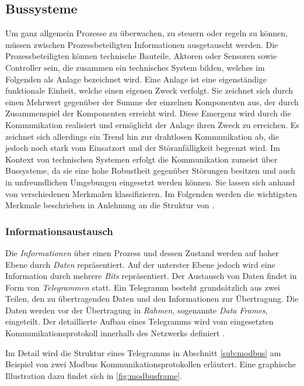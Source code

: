 \subsection{Bussysteme}

Um ganz allgemein Prozesse zu überwachen, zu steuern oder regeln zu können, müssen zwischen Prozessbeteiligten Informationen ausgetauscht werden. 
Die Prozessbeteiligten können technische Bauteile, Aktoren oder Sensoren sowie Controller sein, die zusammen ein technisches System bilden, welches im Folgenden als Anlage bezeichnet wird. Eine Anlage ist eine eigenständige funktionale Einheit, welche einen eigenen Zweck verfolgt. Sie zeichnet sich durch einen Mehrwert gegenüber der Summe der einzelnen Komponenten aus, der durch Zusammenspiel der Komponenten erreicht wird. Diese Emergenz wird durch die Kommunikation realisiert und ermöglicht der Anlage ihren Zweck zu erreichen.
Es zeichnet sich allerdings ein Trend hin zur drahtlosen Kommunikation ab, die jedoch noch stark vom Einsatzort und der Störanfälligkeit begrenzt wird. Im Kontext von technischen Systemen erfolgt die Kommunikation zumeist über Bussysteme, da sie eine hohe Robustheit gegenüber Störungen besitzen und auch in unfreundlichen Umgebungen eingesetzt werden können. Sie lassen sich anhand von verschiedenen Merkmalen klassifizieren. Im Folgenden werden die wichtigsten Merkmale beschrieben in Anlehnung an die Struktur von \cite{schn06}.


\subsubsection{Informationsaustausch}

Die \textit{Informationen} über einen Prozess und dessen Zustand werden auf hoher Ebene durch \textit{Daten} repräsentiert. Auf der unterster Ebene jedoch wird eine Information durch mehrere \textit{Bits} repräsentiert. Der Austausch von Daten findet in Form von \textit{Telegrammen} statt. Ein Telegramm besteht grundsätzlich aus zwei Teilen, den zu übertragenden Daten und den Informationen zur Übertragung. Die Daten werden vor der Übertragung in \textit{Rahmen}, sogenannte \textit{Data Frames}, eingeteilt. Der detaillierte Aufbau eines Telegramms wird vom eingesetzten Kommunikationsprotokoll innerhalb des Netzwerks definiert \cite[S.~11f.]{schn06}.

Im Detail wird die Struktur eines Telegramms in Abschnitt \ref{sub:modbus} am Beispiel von zwei Modbus Kommunikationsprotokollen erläutert. Eine graphische Illustration dazu findet sich in \ref{fig:modbusframe}.

